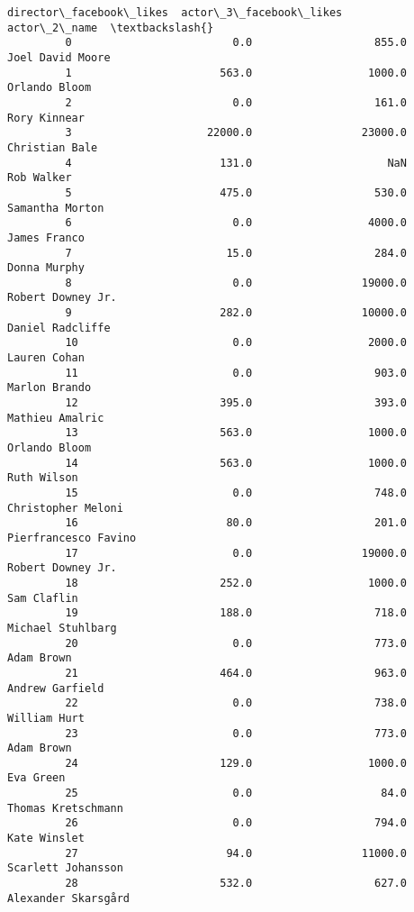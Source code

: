 \documentclass[11pt]{article}
\begin{document}
\begin{Verbatim}[commandchars=\\\{\}]
               director\_facebook\_likes  actor\_3\_facebook\_likes          actor\_2\_name  \textbackslash{}
         0                         0.0                   855.0      Joel David Moore   
         1                       563.0                  1000.0         Orlando Bloom   
         2                         0.0                   161.0          Rory Kinnear   
         3                     22000.0                 23000.0        Christian Bale   
         4                       131.0                     NaN            Rob Walker   
         5                       475.0                   530.0       Samantha Morton   
         6                         0.0                  4000.0          James Franco   
         7                        15.0                   284.0          Donna Murphy   
         8                         0.0                 19000.0     Robert Downey Jr.   
         9                       282.0                 10000.0      Daniel Radcliffe   
         10                        0.0                  2000.0          Lauren Cohan   
         11                        0.0                   903.0         Marlon Brando   
         12                      395.0                   393.0       Mathieu Amalric   
         13                      563.0                  1000.0         Orlando Bloom   
         14                      563.0                  1000.0           Ruth Wilson   
         15                        0.0                   748.0    Christopher Meloni   
         16                       80.0                   201.0  Pierfrancesco Favino   
         17                        0.0                 19000.0     Robert Downey Jr.   
         18                      252.0                  1000.0           Sam Claflin   
         19                      188.0                   718.0     Michael Stuhlbarg   
         20                        0.0                   773.0            Adam Brown   
         21                      464.0                   963.0       Andrew Garfield   
         22                        0.0                   738.0          William Hurt   
         23                        0.0                   773.0            Adam Brown   
         24                      129.0                  1000.0             Eva Green   
         25                        0.0                    84.0    Thomas Kretschmann   
         26                        0.0                   794.0          Kate Winslet   
         27                       94.0                 11000.0    Scarlett Johansson   
         28                      532.0                   627.0   Alexander Skarsgård   

\end{Verbatim}
\end{document}
